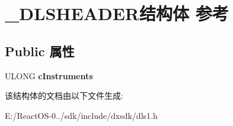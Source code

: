 \hypertarget{struct___d_l_s_h_e_a_d_e_r}{}\section{\+\_\+\+D\+L\+S\+H\+E\+A\+D\+E\+R结构体 参考}
\label{struct___d_l_s_h_e_a_d_e_r}
\subsection*{Public 属性}
\begin{DoxyCompactItemize}
\item 
\mbox{\label{struct___d_l_s_h_e_a_d_e_r_a49cce8eff853985a50646d30b7cbe929}} 
U\+L\+O\+NG {\bfseries c\+Instruments}
\end{DoxyCompactItemize}


该结构体的文档由以下文件生成\+:\begin{DoxyCompactItemize}
\item 
E\+:/\+React\+O\+S-\/0../sdk/include/dxsdk/dls1.\+h\end{DoxyCompactItemize}
